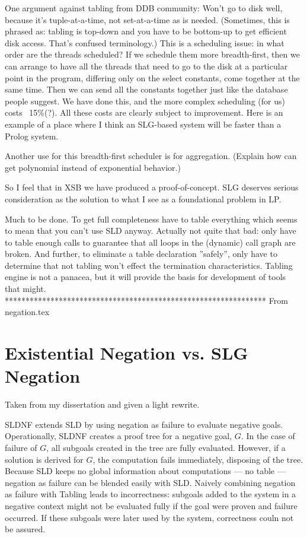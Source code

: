 One argument against tabling from DDB community: Won't go to disk
well, because it's tuple-at-a-time, not set-at-a-time as is needed.
(Sometimes, this is phrased as: tabling is top-down and you have to be
bottom-up to get efficient disk access.  That's confused terminology.)
This is a scheduling issue: in what order are the threads scheduled?
If we schedule them more breadth-first, then we can arrange to have
all the threads that need to go to the disk at a particular point in
the program, differing only on the select constants, come together at
the same time.  Then we can send all the constants together just like
the database people suggest.  We have done this, and the more complex
scheduling (for us) costs ~15\%(?).  All these costs are clearly
subject to improvement.  Here is an example of a place where I think
an SLG-based system will be faster than a Prolog system.

Another use for this breadth-first scheduler is for aggregation.
(Explain how can get polynomial instead of exponential behavior.)

So I feel that in XSB we have produced a proof-of-concept.  SLG
deserves serious consideration as the solution to what I see as a
foundational problem in LP.

Much to be done.  To get full completeness have to table everything
which seems to mean that you can't use SLD anyway.  Actually not quite
that bad: only have to table enough calls to guarantee that all loops
in the (dynamic) call graph are broken.  And further, to eliminate a
table declaration ''safely'', only have to determine that not tabling
won't effect the termination characteristics.  Tabling engine is not a
panacea, but it will provide the basis for development of tools that
might.
***************************************************************
From negation.tex

\section{Existential Negation vs. SLG Negation}

Taken from my dissertation and given a light rewrite.

SLDNF extends SLD by using negation as failure to evaluate negative
goals.  Operationally, SLDNF creates a proof tree for a negative goal,
$G$.  In the case of failure of $G$, all subgoals created in the tree
are fully evaluated.  However, if a solution is derived for $G$, the
computation fails immediately, disposing of the tree.  Because SLD
keeps no global information about computations --- no table ---
negation as failure can be blended easily with SLD.  Naively combining
negation as failure with Tabling leads to incorrectness: subgoals
added to the system in a negative context might not be evaluated fully
if the goal were proven and failure occurred.  If these subgoals were
later used by the system, correctness couln not be assured.

